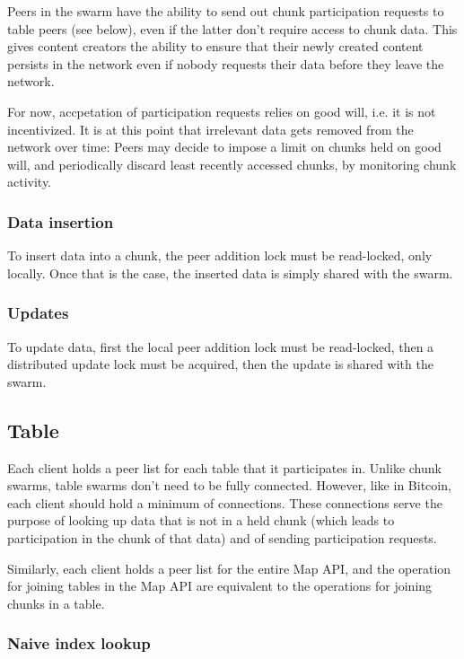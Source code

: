 \documentclass{article}
\begin{document}
Peers in the swarm have the ability to send out chunk participation requests
to table peers (see below), even if the latter don't require access to chunk
data. This gives content creators the ability to ensure that their newly created
content persists in the network even if nobody requests their data before they
leave the network. 

For now, accpetation of participation requests relies on good will, i.e. it is 
not incentivized. It is at this point that irrelevant data gets removed from the
network over time: Peers may decide to impose a limit on chunks held on good
will, and periodically discard least recently accessed chunks, by monitoring
chunk activity.

\subsubsection{Data insertion}

To insert data into a chunk, the peer addition lock must be read-locked, only 
locally. Once that is the case, the inserted data is simply shared with the 
swarm.

\subsubsection{Updates}

To update data, first the local peer addition lock must be read-locked, then a 
distributed update lock must be acquired, then the update is shared with the 
swarm.

\subsection{Table}

Each client holds a peer list for each table that it participates in. Unlike
chunk swarms, table swarms don't need to be fully connected. However, like in
Bitcoin, each client should hold a minimum of connections. These connections
serve the purpose of looking up data that is not in a held chunk (which leads
to participation in the chunk of that data) and of sending participation
requests. 

Similarly, each client holds a peer list for the entire Map API, and the
operation for joining tables in the Map API are equivalent to the operations for
joining chunks in a table.

\subsubsection{Naive index lookup}
\end{document}
